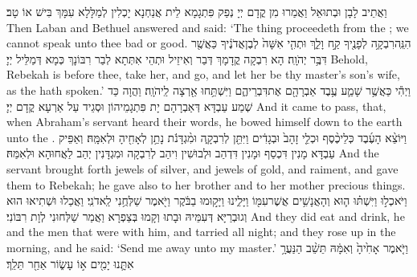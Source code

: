 {וַאֲתֵיב לָבָן וּבְתוּאֵל וַאֲמַרוּ מִן קֳדָם יְיָ נְפַק פִּתְגָמָא לֵית אֲנַחְנָא יָכְלִין לְמַלָּלָא עִמָּךְ בִּישׁ אוֹ טָב׃}
{Then Laban and Bethuel answered and said: ‘The thing proceedeth from the \lord; we cannot speak unto thee bad or good.}{}
{הִנֵּֽה\maqqaf רִבְקָ֥ה לְפָנֶ֖יךָ קַ֣ח וָלֵ֑ךְ וּתְהִ֤י אִשָּׁה֙ לְבֶן\maqqaf אֲדֹנֶ֔יךָ כַּאֲשֶׁ֖ר דִּבֶּ֥ר יְהֹוָֽה׃}
{הָא רִבְקָה קֳדָמָךְ דְּבַר וְאִיזֵיל וּתְהֵי אִתְּתָא לְבַר רִבּוֹנָךְ כְּמָא דְּמַלֵּיל יְיָ׃}
{Behold, Rebekah is before thee, take her, and go, and let her be thy master’s son’s wife, as the \lord\space hath spoken.’}{}
{וַיְהִ֕י כַּאֲשֶׁ֥ר שָׁמַ֛ע עֶ֥בֶד אַבְרָהָ֖ם אֶת\maqqaf דִּבְרֵיהֶ֑ם וַיִּשְׁתַּ֥חוּ אַ֖רְצָה לַֽיהֹוָֽה׃}
{וַהֲוָה כַּד שְׁמַע עַבְדָּא דְּאַבְרָהָם יָת פִּתְגָמֵיהוֹן וּסְגֵיד עַל אַרְעָא קֳדָם יְיָ׃}
{And it came to pass, that, when Abraham’s servant heard their words, he bowed himself down to the earth unto the \lord.}{}
{וַיּוֹצֵ֨א הָעֶ֜בֶד כְּלֵי\maqqaf כֶ֨סֶף וּכְלֵ֤י זָהָב֙ וּבְגָדִ֔ים וַיִּתֵּ֖ן לְרִבְקָ֑ה וּמִ֨גְדָּנֹ֔ת נָתַ֥ן לְאָחִ֖יהָ וּלְאִמָּֽהּ׃}
{וְאַפֵּיק עַבְדָּא מָנִין דִּכְסַף וּמָנִין דִּדְהַב וּלְבוּשִׁין וִיהַב לְרִבְקָה וּמִגְדָּנִין יְהַב לַאֲחוּהָא וּלְאִמַּהּ׃}
{And the servant brought forth jewels of silver, and jewels of gold, and raiment, and gave them to Rebekah; he gave also to her brother and to her mother precious things.}{}
{וַיֹּאכְל֣וּ וַיִּשְׁתּ֗וּ ה֛וּא וְהָאֲנָשִׁ֥ים אֲשֶׁר\maqqaf עִמּ֖וֹ וַיָּלִ֑ינוּ וַיָּק֣וּמוּ בַבֹּ֔קֶר וַיֹּ֖אמֶר שַׁלְּחֻ֥נִי לַֽאדֹנִֽי׃}
{וַאֲכַלוּ וּשְׁתִיאוּ הוּא וְגוּבְרַיָּא דְּעִמֵּיהּ וּבָתוּ וְקָמוּ בְּצַפְרָא וַאֲמַר שַׁלְּחוּנִי לְוָת רִבּוֹנִי׃}
{And they did eat and drink, he and the men that were with him, and tarried all night; and they rose up in the morning, and he said: ‘Send me away unto my master.’}{}
{וַיֹּ֤אמֶר אָחִ֙יהָ֙ וְאִמָּ֔הּ תֵּשֵׁ֨ב הַנַּעֲרָ֥ אִתָּ֛נוּ יָמִ֖ים א֣וֹ עָשׂ֑וֹר אַחַ֖ר תֵּלֵֽךְ׃}
